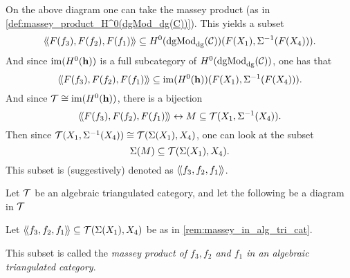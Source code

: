 \begin{remark}
    On the above diagram one can take the massey product (as in \autoref{def:massey_product_H^0(dgMod_dg(C))}). This yields a subset
    \[
        \langle \! \langle F(f_3), F(f_2), F(f_1)\rangle \! \rangle \subseteq H^0(\operatorname{dgMod}_{\operatorname{dg}}({\mathcal{C}}))(F(X_1), \Sigma^{-1}(F(X_4))).
    \]
    And since \( \operatorname{im}(H^0(\mathbf{h})) \) is a full subcategory of \( H^0(\operatorname{dgMod}_{\operatorname{dg}}({\mathcal{C}})) \), one has that
    \[
        \langle \! \langle F(f_3), F(f_2), F(f_1)\rangle \! \rangle \subseteq \operatorname{im}(H^0(\mathbf{h}))(F(X_1), \Sigma^{-1}(F(X_4))).
    \]
    And since \( {\mathcal{T}} \cong \operatorname{im}(H^0(\mathbf{h})) \), there is a bijection
    \[
        \langle \! \langle F(f_3), F(f_2), F(f_1)\rangle \! \rangle \leftrightarrow M \subseteq {\mathcal{T}}(X_1, \Sigma^{-1}(X_4)).
    \]
    Then since \( {\mathcal{T}}(X_1, \Sigma^{-1}(X_4)) \cong {\mathcal{T}}(\Sigma(X_1), X_4) \), one can look at the subset
    \[
        \Sigma(M) \subseteq {\mathcal{T}}(\Sigma(X_1), X_4).
    \]
    This subset is (suggestively) denoted as \( \langle \! \langle f_3, f_2, f_1\rangle \! \rangle \).
\end{remark}

\begin{definition}
    Let \( {\mathcal{T}} \) be an algebraic triangulated category, and let the following be a diagram in \( {\mathcal{T}} \)
    \begin{center}
    \end{center}
    Let \( \langle \! \langle f_3, f_2, f_1\rangle \! \rangle \subseteq {\mathcal{T}}(\Sigma(X_1), X_4) \) be as in \autoref{rem:massey_in_alg_tri_cat}.

    This subset is called the \emph{massey product of \( f_3, f_2 \) and \( f_1 \) in an algebraic triangulated category}.
\end{definition}



